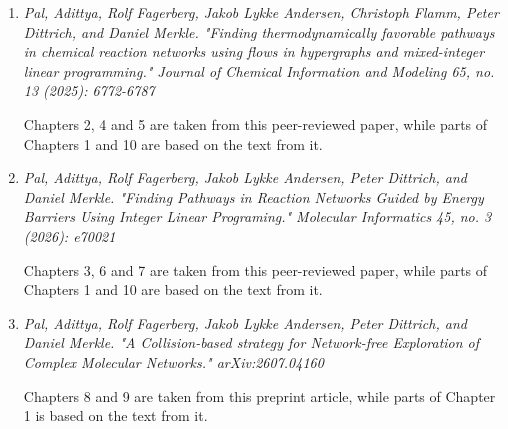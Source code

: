 \begin{enumerate}
	\item \textsf{\textsl{Pal, Adittya, Rolf Fagerberg, Jakob Lykke Andersen, Christoph Flamm, Peter Dittrich, and Daniel Merkle. "Finding thermodynamically favorable pathways in chemical reaction networks using flows in hypergraphs and mixed-integer linear programming." Journal of Chemical Information and Modeling 65, no. 13 (2025): 6772-6787}}
	
	Chapters 2, 4 and 5 are taken from this peer-reviewed paper, while parts of Chapters 1 and 10 are based on the text from it. 
	
	\item \textsf{\textsl{Pal, Adittya, Rolf Fagerberg, Jakob Lykke Andersen, Peter Dittrich, and Daniel Merkle. "Finding Pathways in Reaction Networks Guided by Energy Barriers Using Integer Linear Programing." Molecular Informatics 45, no. 3 (2026): e70021}}
	
	Chapters 3, 6 and 7 are taken from this peer-reviewed paper, while parts of Chapters 1 and 10 are based on the text from it. 
	
	\item \textsf{\textsl{Pal, Adittya, Rolf Fagerberg, Jakob Lykke Andersen, Peter Dittrich, and Daniel Merkle. "A Collision-based strategy for Network-free Exploration of Complex Molecular Networks." arXiv:2607.04160}}
	
	Chapters 8 and 9 are taken from this preprint article, while parts of Chapter 1 is based on the text from it.
\end{enumerate}

